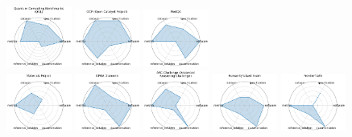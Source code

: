 \begin{figure}[ht!]
\includegraphics[width=0.1900\textwidth]{images/quantum_computing_benchmarks_qml_radar.pdf}
\includegraphics[width=0.1900\textwidth]{images/ocp_open_catalyst_project_radar.pdf}
\includegraphics[width=0.1900\textwidth]{images/medqa_radar.pdf}
\\[1ex]
\includegraphics[width=0.1900\textwidth]{images/materials_project_radar.pdf}
\includegraphics[width=0.1900\textwidth]{images/gpqa_diamond_radar.pdf}
\includegraphics[width=0.1900\textwidth]{images/arc-challenge_advanced_reasoning_challenge_radar.pdf}
\includegraphics[width=0.1900\textwidth]{images/humanitys_last_exam_radar.pdf}
\includegraphics[width=0.1900\textwidth]{images/frontiermath_radar.pdf}

\end{figure}
